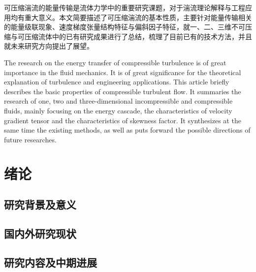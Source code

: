 \documentclass[midterm]{../package/ecpknproposal}
\begin{document}
\maketitle

\linespread{1.5}
\pagestyle{frontmatter}
\maketoc %

\begin{cabstract}
可压缩湍流的能量传输是流体力学中的重要研究课题，对于湍流理论解释与工程应用均有重大意义。本文简要描述了可压缩湍流的基本性质，主要针对能量传输相关的能量级联现象、速度梯度张量结构特征与偏斜因子特征，就一、二、三维不可压缩与可压缩流体中的已有研究成果进行了总结，梳理了目前已有的技术方法，并且就未来研究方向提出了展望。
\end{cabstract}


\begin{eabstract}
The research on the energy transfer of compressible turbulence is of great importance in the fluid mechanics. It is of great significance for the theoretical explanation of turbulence and engineering applications. This article briefly describes the basic properties of compressible turbulent flow. It summaries the research of one, two and three-dimensional incompressible and compressible fluids, mainly focusing on the energy cascade, the characteristics of velocity gradient tensor and the characteristics of skewness factor. It synthesizes at the same time the existing methods, as well as puts forward the possible directions of future researches.
\end{eabstract}

\newpage

\section{绪论}
\subsection{研究背景及意义}

\subsection{国内外研究现状}

\subsection{研究内容及中期进展}
\end{document}
